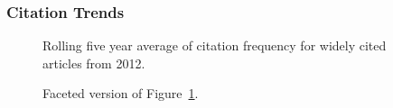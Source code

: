 \documentclass[
  10pt,
  letterpaper,
  DIV=11,
  numbers=noendperiod,
  twoside]{scrartcl}
\begin{document}
\subsubsection*{Citation Trends}\label{citation-trends-36}

\begin{figure}


\caption{\label{fig-citation-spaghetti-2012}Rolling five year average of
citation frequency for widely cited articles from 2012.}

\end{figure}%

\begin{figure}


\caption{\label{fig-citation-facet-2012}Faceted version of
Figure~\ref{fig-citation-spaghetti-2012}.}

\end{figure}%
\end{document}
